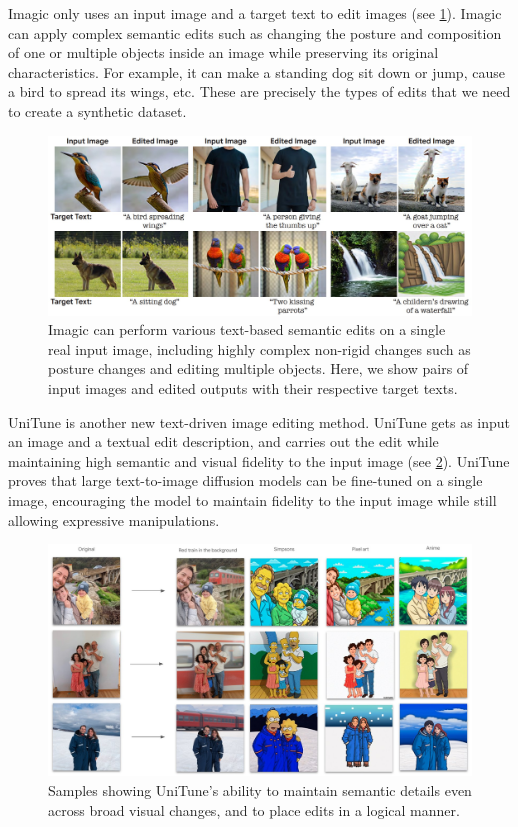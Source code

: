 Imagic \cite{kawar2022imagic} only uses an input image and a target text to edit images (see \cref{fig:imagic}). Imagic can apply complex semantic edits such as changing the posture and composition of one or multiple objects inside
an image while preserving its original characteristics. For example, it can make a standing dog sit down or jump, cause a bird to spread its wings, etc. These are precisely the types of edits that we need to create a synthetic dataset.

\begin{figure}[ht]
    \centering
    \includegraphics[width=\linewidth]{images/future/imagic.jpg}
    \caption{Imagic can perform various text-based semantic edits on a single real input image, including highly complex non-rigid changes such as posture changes and editing multiple objects. Here, we show pairs of input images and edited outputs with their respective target texts.}
    \label{fig:imagic}
\end{figure}

UniTune \cite{valevski2022unitune} is another new text-driven image editing method. UniTune gets as input an image and a textual edit description, and carries out the edit while maintaining high semantic and visual fidelity to the input image (see \cref{fig:unitune}). UniTune proves that large text-to-image diffusion models can be fine-tuned on a single image, encouraging the model to maintain fidelity to the input image while still allowing expressive manipulations.

\begin{figure}[ht]
    \centering
    \includegraphics[width=\linewidth]{images/future/unitune.jpg}
    \caption{Samples showing UniTune’s ability to maintain semantic details even across broad visual changes, and to place edits in a logical manner.}
    \label{fig:unitune}
\end{figure}

